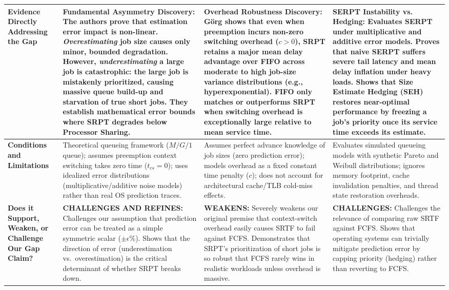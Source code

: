 \documentclass[11pt]{article}
\begin{document}
{\begin{longtable}{|>{\raggedright\arraybackslash}p{3.2cm}|>{\raggedright\arraybackslash}p{3.9cm}|>{\raggedright\arraybackslash}p{3.9cm}|>{\raggedright\arraybackslash}p{4.2cm}|}
    \textbf{Evidence Directly Addressing the Gap} & 
    \textbf{Fundamental Asymmetry Discovery:} The authors prove that estimation error impact is non-linear. \textit{Overestimating} job size causes only minor, bounded degradation. However, \textit{underestimating} a large job is catastrophic: the large job is mistakenly prioritized, causing massive queue build-up and starvation of true short jobs. They establish mathematical error bounds where SRPT degrades below Processor Sharing. & 
    \textbf{Overhead Robustness Discovery:} G{\"o}rg shows that even when preemption incurs non-zero switching overhead ($c > 0$), SRPT retains a major mean delay advantage over FIFO across moderate to high job-size variance distributions (e.g., hyperexponential). FIFO only matches or outperforms SRPT when switching overhead is exceptionally large relative to mean service time. & 
    \textbf{SERPT Instability vs. Hedging:} Evaluates SERPT under multiplicative and additive error models. Proves that naive SERPT suffers severe tail latency and mean delay inflation under heavy loads. Shows that Size Estimate Hedging (SEH) restores near-optimal performance by freezing a job's priority once its service time exceeds its estimate. \\
    \hline

    \textbf{Conditions and Limitations} & 
    Theoretical queueing framework ($M/G/1$ queue); assumes preemption context switching takes zero time ($t_{cs}=0$); uses idealized error distributions (multiplicative/additive noise models) rather than real OS prediction traces. & 
    Assumes perfect advance knowledge of job sizes (zero prediction error); models overhead as a fixed constant time penalty ($c$); does not account for architectural cache/TLB cold-miss effects. & 
    Evaluates simulated queueing models with synthetic Pareto and Weibull distributions; ignores memory footprint, cache invalidation penalties, and thread state restoration overheads. \\
    \hline

    \textbf{Does it Support, Weaken, or Challenge Our Gap Claim?} & 
    \textbf{CHALLENGES AND REFINES:} Challenges our assumption that prediction error can be treated as a simple symmetric scalar ($\pm \epsilon\%$). Shows that the direction of error (underestimation vs.\ overestimation) is the critical determinant of whether SRPT breaks down. & 
    \textbf{WEAKENS:} Severely weakens our original premise that context-switch overhead easily causes SRTF to fail against FCFS. Demonstrates that SRPT's prioritization of short jobs is so robust that FCFS rarely wins in realistic workloads unless overhead is massive. & 
    \textbf{CHALLENGES:} Challenges the relevance of comparing raw SRTF against FCFS. Shows that operating systems can trivially mitigate prediction error by capping priority (hedging) rather than reverting to FCFS. \\
    \hline


\end{longtable}}
\end{document}
